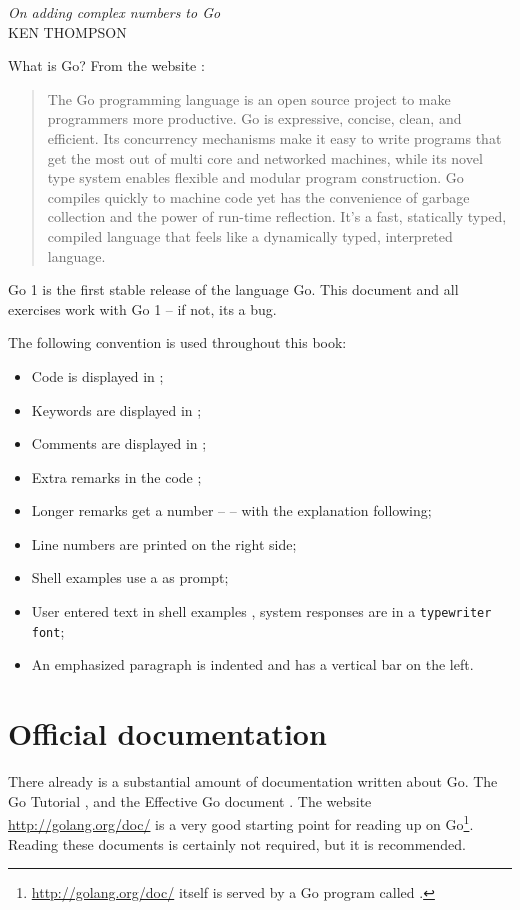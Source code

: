 {\textit{On adding complex numbers to Go}\\ \textsc{KEN THOMPSON}}

\noindent{}What is Go? From the website \cite{go_web}:
\begin{quote}
The Go programming language is an open source project to make
programmers more productive. Go is expressive, concise, clean, and
efficient. Its concurrency mechanisms make it easy to write programs
that get the most out of multi core and networked machines, while its
novel type system enables flexible and modular program construction. Go
compiles quickly to machine code yet has the convenience of garbage
collection and the power of run-time reflection. It's a fast, statically
typed, compiled language that feels like a dynamically typed,
interpreted language.
\end{quote}

Go 1 is the first stable release of the language Go. 
This document and all exercises work with Go 1 -- if not, its
a bug.

The following convention is used throughout this book:
\begin{itemize}
\item Code is displayed in ;
\item Keywords are displayed in ;
\item Comments are displayed in ;
\item Extra remarks in the code ;
\item Longer remarks get a number --  -- with the explanation following;
\item Line numbers are printed on the right side;
\item Shell examples use a \pr{} as prompt;
\item User entered text in shell examples \texttt{}, system responses
are in a \texttt{typewriter font};
\item An emphasized paragraph is indented and has a vertical bar on the
left.
\end{itemize}

\section{Official documentation}
There already is a substantial amount of documentation written about Go.
The Go Tutorial \cite{go_tutorial}, and the Effective Go
document \cite{effective_go}. The
website \url{http://golang.org/doc/} is a very good starting point
for reading up on Go\footnote{\url{http://golang.org/doc/} itself is served by 
a Go program called .}. Reading these documents is
certainly not required, but it is recommended.

